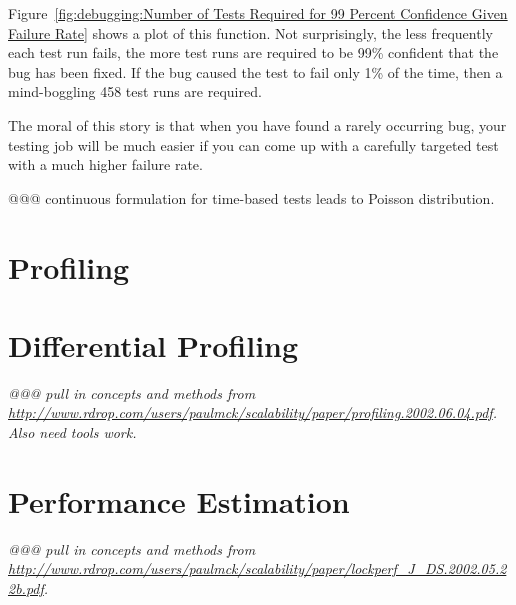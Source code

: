 Figure~\ref{fig:debugging:Number of Tests Required for 99 Percent Confidence Given Failure Rate}
shows a plot of this function.
Not surprisingly, the less frequently each test run fails, the more
test runs are required to be 99\% confident that the bug has been
fixed.
If the bug caused the test to fail only 1\% of the time, then a
mind-boggling 458 test runs are required.

The moral of this story is that when you have found a rarely occurring
bug, your testing job will be much easier if you can come up with
a carefully targeted test with a much higher failure rate.

@@@ continuous formulation for time-based tests leads to Poisson distribution.

\section{Profiling}
\label{sec:analysis:Profiling}

\section{Differential Profiling}
\label{sec:analysis:Differential Profiling}

{\em @@@ pull in concepts and methods from
\url{http://www.rdrop.com/users/paulmck/scalability/paper/profiling.2002.06.04.pdf}.
Also need tools work.}

\section{Performance Estimation}
\label{sec:analysis:Performance Estimation}

{\em @@@ pull in concepts and methods from
\url{http://www.rdrop.com/users/paulmck/scalability/paper/lockperf_J_DS.2002.05.22b.pdf}.}
